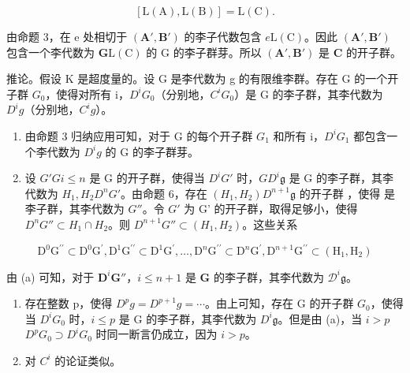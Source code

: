 \[
[ \mathrm{L} (\mathrm{A}), \mathrm{L} (\mathrm{B}) ] = \mathrm{L} (\mathrm{C}).
\]

由命题 3，在 e 处相切于 \((\mathbf{A}',\mathbf{B}')\) 的李子代数包含 \(e\)\(\mathrm{L}(\mathrm{C})\)。因此 \((\mathbf{A}',\mathbf{B}')\) 包含一个李代数为 \(\mathbf{G}\)\(\mathrm{L}(\mathrm{C})\) 的 G 的李子群芽。所以 \((\mathbf{A}',\mathbf{B}')\) 是 \(\mathbf{C}\) 的开子群。

推论。假设 K 是超度量的。设 G 是李代数为 g 的有限维李群。存在 G 的一个开子群 \(G_{0}\)，使得对所有 i，\(D^{i}G_{0}\)（分别地，\(C^{i}G_{0}\)）是 G 的李子群，其李代数为 \(D^{i}g\)（分别地，\(C^{i}g\)）。

\begin{enumerate}
\def\labelenumi{(\alph{enumi})}
\item
  由命题 3 归纳应用可知，对于 G 的每个开子群 \(G_{1}\) 和所有 i，\(D^{i}G_{1}\) 都包含一个李代数为 \(D^{i}g\) 的 G 的李子群芽。
\item
  设 \(G'\)\(G\)\(i \leqslant n\) 是 G 的开子群，使得当 \(D^i G'\) 时，\(G\)\(D^i\mathfrak{g}\) 是 G 的李子群，其李代数为 \(H_1, H_2\)\(D^n G'\)。由命题 6，存在 \((H_1, H_2)\)\(D^{n+1}\mathfrak{g}\) 的开子群 ，使得  是李子群，其李代数为 \(G''\)。令 \(G'\) 为 G' 的开子群，取得足够小，使得 \(D^n G'' \subset H_1 \cap H_2\)。则 \(D^{n+1}G'' \subset (H_1, H_2)\)。这些关系
\end{enumerate}

\[
\mathrm{D} ^ {0} \mathrm{G} ^ {\prime \prime} \subset \mathrm{D} ^ {0} \mathrm{G} ^ {\prime}, \mathrm{D} ^ {1} \mathrm{G} ^ {\prime \prime} \subset \mathrm{D} ^ {1} \mathrm{G} ^ {\prime}, \dots , \mathrm{D} ^ {n} \mathrm{G} ^ {\prime \prime} \subset \mathrm{D} ^ {n} \mathrm{G} ^ {\prime}, \mathrm{D} ^ {n + 1} \mathrm{G} ^ {\prime \prime} \subset (\mathrm{H} _ {1}, \mathrm{H} _ {2})
\]

由 (a) 可知，对于 \(\mathbf{D}^i\mathbf{G}''\)，\(i\leqslant n + 1\) 是 \(\mathbf{G}\) 的李子群，其李代数为 \(\mathcal{D}^i\mathfrak{g}\)。

\begin{enumerate}
\def\labelenumi{(\alph{enumi})}
\setcounter{enumi}{2}
\item
  存在整数 p，使得 \(D^{p}g = D^{p+1}g = \cdots\)。由上可知，存在 G 的开子群 \(G_{0}\)，使得当 \(D^{i}G_{0}\) 时，\(i \leqslant p\) 是 G 的李子群，其李代数为 \(D^{i}\mathfrak{g}\)。但是由 (a)，当 \(i > p\)\(D^{p}G_{0} \supset D^{i}G_{0}\) 时同一断言仍成立，因为 \(i > p\)。
\item
  对 \(C^{i}\) 的论证类似。
\end{enumerate}

